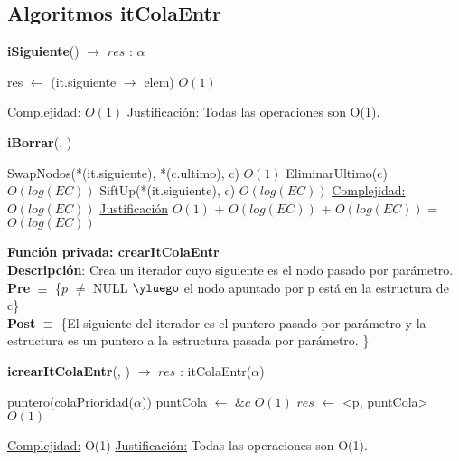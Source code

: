 \begin{Algoritmos}
\subsection{Algoritmos itColaEntr}

\begin{algorithm}[H]
{\textbf{iSiguiente}() $\to$ $res$ : $\alpha$}
\begin{algorithmic}[1]
    \State res $\gets$ (it.siguiente $\rightarrow$ elem) \Comment $O(1)$

    \medskip
    \Statex \underline{Complejidad:} $O(1)$
    \Statex \underline{Justificaci\'on:} Todas las operaciones son O(1).
\end{algorithmic}
\end{algorithm}


\begin{algorithm}[H]
{\textbf{iBorrar}(, )}
\begin{algorithmic}[1]
    \State SwapNodos(*(it.siguiente), *(c.ultimo), c) \Comment $O(1)$
	\State EliminarUltimo(c) \Comment $O(log(EC))$
	\State SiftUp(*(it.siguiente), c) \Comment $O(log(EC))$
    \medskip
    \Statex \underline{Complejidad:} $O(log(EC))$
    \Statex \underline{Justificaci\'on} $O(1)$ + $O(log(EC))$ + $O(log(EC))$ = $O(log(EC))$
\end{algorithmic}
\end{algorithm}

\textbf{Funci\'on privada: crearItColaEntr}\\
\textbf{Descripci\'on}: Crea un iterador cuyo siguiente es el nodo pasado por par\'ametro. \\
\textbf{Pre} $\equiv$ \{$p$ $\neq$ NULL $\yluego$ el nodo apuntado por p est\'a en la estructura de c\}\\%
\textbf{Post} $\equiv$ \{El siguiente del iterador es el puntero pasado por par\'ametro y la estructura es un puntero a la estructura pasada por par\'ametro. \}%
\begin{algorithm}[H]
{\textbf{icrearItColaEntr}(, ) $\to$ $res$ : itColaEntr($\alpha$)}
\begin{algorithmic}[1]

    \State puntero(colaPrioridad($\alpha$)) puntCola $\gets$ $\&c$ \Comment $O(1)$
    \State $res$ $\gets$ <p, puntCola> \Comment $O(1)$
   
    \medskip
    \Statex \underline{Complejidad:} O(1)
    \Statex \underline{Justificaci\'on:} Todas las operaciones son O(1).
\end{algorithmic}
\end{algorithm}

\end{Algoritmos}